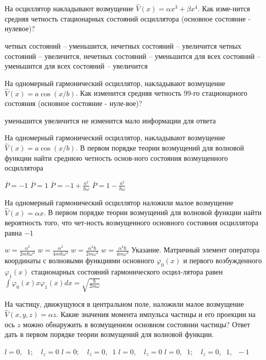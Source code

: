 \documentclass[11pt,a4paper]{exam}
\begin{document}
\begin{questions}
\question На осциллятор накладывают возмущение $\hat V(x) = \alpha {x^3} + \beta {x^4}$. Как изме-нится средняя четность стационарных состояний осциллятора (основное состояние - нулевое)?
\begin{choices}
\choice четных состояний – уменьшится, нечетных состояний – увеличится
\choice четных состояний – увеличится, нечетных состояний – уменьшится
\choice для всех состояний – уменьшится
\choice для всех состояний – увеличится
\end{choices}

\question На одномерный гармонический осциллятор, накладывают возмущение $\hat V(x) = a\cos (x/b)$. Как изменится средняя четность 99-го стационарного состояния (основное состояние - нуле-вое)?
\begin{choices}
\choice уменьшится  
\choice увеличится     
\choice не изменится   
\choice мало информации для ответа
\end{choices}

\question На одномерный гармонический осциллятор, накладывают возмущение $\hat V(x) = a\cos (x/b)$. В первом порядке теории возмущений для волновой функции найти среднюю четность основ-ного состояния возмущенного осциллятора
\begin{choices}
\choice $\overline P  =  - 1$      
\choice $\overline P  = 1$      
\choice $\overline P  =  - 1 + \frac{{{a^2}}}{{\hbar \omega }}$  
\choice $\overline P  = 1 - \frac{{{a^2}}}{{\hbar \omega }}$
\end{choices}

\question На одномерный гармонический осциллятор наложили малое возмущение $\hat V(x) = \alpha x$. В первом порядке теории возмущений для волновой функции найти вероятность того, что чет-ность возмущенного основного состояния осциллятора равна $ - 1$
\begin{choices}
\choice $w = \frac{{{\alpha ^2}}}{{2m\hbar {\omega ^3}}}$  
\choice $w = \frac{{{\alpha ^2}}}{{4m\hbar {\omega ^3}}}$  
\choice $w = \frac{{{\alpha ^2}\hbar }}{{2m{\omega ^3}}}$     
\choice $w = \frac{{{\alpha ^2}\hbar }}{{4m{\omega ^3}}}$
Указание. Матричный элемент оператора координаты с волновыми функциями основного ${\varphi _0}(x)$ и первого возбужденного ${\varphi _1}(x)$ стационарных состояний гармонического осцил-лятора равен $\int {{\varphi _0}(x)x{\varphi _1}(x)dx = } \sqrt {\frac{\hbar }{{2m\omega }}} $
\end{choices}

\question На частицу, движущуюся в центральном поле, наложили малое возмущение $\hat V(x,y,z) = \alpha z$. Какие значения момента импульса частицы и его проекции на ось $z$ можно обнаружить в возмущенном основном состоянии частицы? Ответ дать в первом порядке теории возмущений для волновой функции.
\begin{choices}
\choice $l = 0,\;\;1;\quad {l_z} = 0$ 
\choice $l = 0;\quad {l_z} = 0,\;\;1$ 
\choice $l = 0,\quad {l_z} = 0$ 
\choice $l = 0,\;\;1;\quad {l_z} = 0,\;\;1,\;\; - 1$
\end{choices}


\end{questions}
\end{document}
